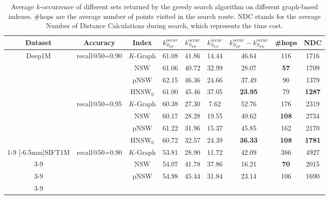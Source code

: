 \documentclass[11pt]{article}
\begin{document}
\begin{table}[t]
\centering
\footnotesize
\caption{Average $k$-occurrence of different sets returned by the greedy search algorithm on different graph-based indexes. \#hops are the average number of points visited in the search route. NDC stands for the average Number of Distance Calculations during search, which represents the time cost.}
\label{zeyu_tab:query-analyses}
\begin{tabular}{ccccccccc}\\
\toprule
Dataset              & Accuracy & Index    & $k^{occur}_{S_{TP}}$    & $k^{occur}_{S_{FP}}$    & $k^{occur}_{S_{FN}}$    & $k^{occur}_{S_{TP}} - k^{occur}_{S_{FN}}$ & \#hops & NDC  \\ \midrule
\multicolumn{1}{c}{\multirow{8}{*}[-6.5mm]{Deep1M}} & \multirow{4}{*}[-3mm]{recall@50=0.90} & $K$-Graph & 61.08 & 41.86 & 14.44 & 46.64 & 116 & 1716 \\ \cmidrule{3-9}
\multicolumn{1}{c}{} &          & NSW      & 61.06 & 40.72 & 32.99 & 28.07   & \textbf{57}     & 1709 \\\cmidrule{3-9}
\multicolumn{1}{c}{} &          & pNSW     & 62.15 & 46.36 & 24.66 & 37.49   & 90     & 1379 \\\cmidrule{3-9}
\multicolumn{1}{c}{} &          & HNSW$_0$ & 61.00 & 45.46 & 37.05 & \textbf{23.95}   & 79     & \textbf{1287} \\\cmidrule{2-9}
\multicolumn{1}{c}{}                        & \multirow{4}{*}[-3mm]{recall@50=0.95} & $K$-Graph & 60.38 & 27.30 & 7.62  & 52.76 & 176 & 2319 \\\cmidrule{3-9}
\multicolumn{1}{c}{} &          & NSW      & 60.17 & 28.28 & 19.55 & 40.62   & \textbf{108}    & 2734 \\\cmidrule{3-9}
\multicolumn{1}{c}{} &          & pNSW     & 61.22 & 31.96 & 15.37 & 45.85  & 162    & 2170 \\\cmidrule{3-9}
\multicolumn{1}{c}{} &          & HNSW$_0$ & 60.72 & 32.57 & 24.39 & \textbf{36.33}   & \textbf{108}    & \textbf{1781} \\\cmidrule{1-9} \cmidrule{1-9}
\multirow{8}{*}[-6.5mm]{SIFT1M}                     & \multirow{4}{*}[-3mm]{recall@50=0.90} & $K$-Graph & 53.81 & 28.90 & 11.72 & 42.09 & 386 & 4927 \\\cmidrule{3-9}
                     &          & NSW      & 54.07 & 41.78 & 37.86 & 16.21   & \textbf{70}     & 2015 \\\cmidrule{3-9}
                     &          & pNSW     & 54.98 & 45.44 & 31.84 & 23.14   & 106    & 1690 \\\cmidrule{3-9}

\end{tabular}
\end{table}
\end{document}
